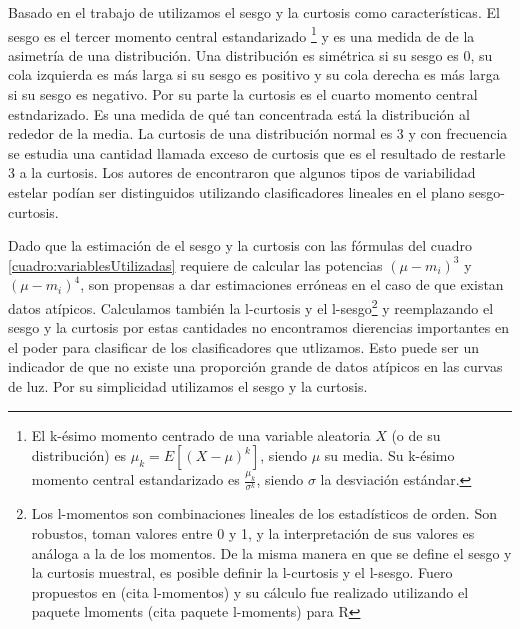 \documentclass[letterpaper,12pt]{book}
\begin{document}
Basado en el trabajo de \cite{rodriguez_feliciano_alisis_2012} utilizamos el sesgo y la curtosis como características. El sesgo es el tercer momento central estandarizado \footnote{El k-ésimo momento centrado de una variable aleatoria $X$ (o de su distribución) es $\mu_{k} =E[(X-\mu)^{k}]$, siendo $\mu$ su media. Su k-ésimo momento central estandarizado es $\frac{\mu_k}{\sigma^k}$, siendo $\sigma$ la desviación estándar.} y es una medida de de la asimetría de una distribución. Una distribución es simétrica si su sesgo es $0$, su cola izquierda es más larga si su sesgo es positivo y su cola derecha es más larga si su sesgo es negativo. Por su parte la curtosis es el cuarto momento central estndarizado. Es una medida de qué tan concentrada está la distribución al rededor de la media. La curtosis de una distribución normal es $3$ y con frecuencia se estudia una cantidad llamada exceso de curtosis que es el resultado de restarle $3$ a la curtosis. Los autores de \cite{rodriguez_feliciano_alisis_2012}  encontraron que algunos tipos de variabilidad estelar podían ser distinguidos utilizando clasificadores lineales en el plano sesgo-curtosis.

Dado que la estimación de el sesgo y la curtosis con las fórmulas del cuadro \ref{cuadro:variablesUtilizadas} requiere de calcular las potencias $(\mu-m_i)^3$ y $(\mu-m_i)^4$, son propensas a dar estimaciones erróneas en el caso de que existan datos atípicos. Calculamos también la l-curtosis y el l-sesgo\footnote{Los l-momentos son combinaciones lineales de los estadísticos de orden. Son robustos, toman valores entre 0 y 1, y la interpretación de sus valores es análoga a la de los momentos. De la misma manera en que se define el sesgo y la curtosis muestral, es posible definir la l-curtosis y el l-sesgo. Fuero propuestos en (cita l-momentos) y su cálculo fue realizado utilizando el paquete lmoments (cita paquete l-moments) para R} y reemplazando el sesgo y la curtosis por estas cantidades no encontramos dierencias importantes en el poder para clasificar de los clasificadores que utlizamos. Esto puede ser un indicador de que no existe una proporción grande de datos atípicos en las curvas de luz. Por su simplicidad utilizamos el sesgo y la curtosis.  
\end{document}
